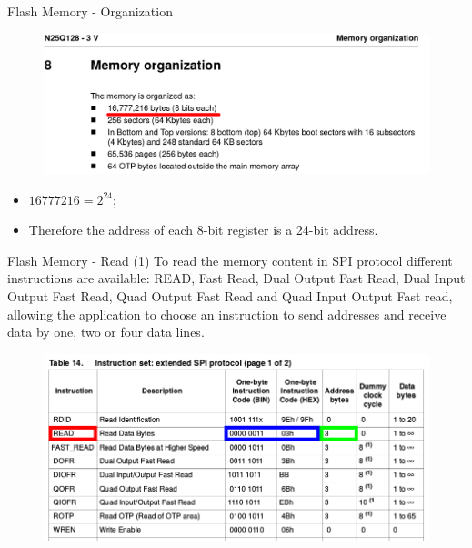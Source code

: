 \documentclass{beamer}
\begin{document}
    \begin{frame}{Flash Memory - Organization}
    	\begin{figure}[!tbh]
    		\centering
    		\includegraphics*[width=1\textwidth]{images/org}
    	\end{figure}    
    	\begin{itemize}
    		\item $16777216 = 2^{24}$;
    		\item Therefore the address of each 8-bit register is a 24-bit address.
    	\end{itemize}  	
    \end{frame}
    

    \begin{frame}{Flash Memory - Read (1) }
  To read the memory content in SPI protocol different instructions are available:
  READ, Fast Read, Dual Output Fast Read, Dual Input Output Fast Read, Quad Output Fast  Read and Quad Input Output Fast read, allowing the application to choose an instruction to  send addresses and receive data by one, two or four data lines.  	
    	\begin{figure}[!tbh]
    		\centering
    		\includegraphics*[width=1\textwidth]{images/table}
    	\end{figure}       	
    \end{frame}
    
\end{document}
